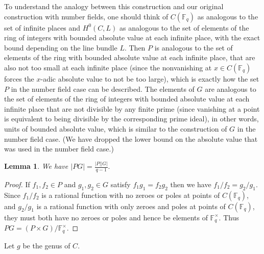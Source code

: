 \documentclass{amsart}
\numberwithin{equation}{section}
\newtheorem{lemma}[theorem]{Lemma}
\begin{document}
To understand the analogy between this construction and our original construction with number fields, one should think of $C(\mathbb F_q)$ as analogous to the set of infinite places and $H^0(C,L)$ as analogous to the set of elements of the ring of integers with bounded absolute value at each infinite place, with the exact bound depending on the line bundle $L$. Then $P$ is analogous to the set of elements of the ring with bounded absolute value at each infinite place, that are also not too small at each infinite place (since the nonvanishing at $x\in C(\mathbb F_q)$ forces the $x$-adic absolute value to not be too large), which is exactly how the set $P$ in the number field case can be described. The elements of $G$ are analogous to the set of elements of the ring of integers with bounded absolute value at each infinite place that are not divisible by any finite prime (since vanishing at a point is equivalent to being divisible by the corresponding prime ideal), in other words, units of bounded absolute value, which is similar to the construction of $G$ in the number field case. (We have dropped the lower bound on the absolute value that was used in the number field case.)

\begin{lemma}\label{ff-pg} We have $ |PG| = \frac{|P| |G|}{q-1}.$\end{lemma}

\begin{proof}  If $f_1,f_2 \in P$ and $g_1,g_2\in G$ satisfy $f_1g_1=f_2g_2$ then we have $f_1/f_2=g_2/g_1$. Since $f_1/f_2$ is a rational function with no zeroes or poles at points of $C(\mathbb F_q)$, and $g_2/g_1$ is a rational function with only zeroes and poles at points of $C(\mathbb F_q)$, they must both have no zeroes or poles and hence be elements of $\mathbb F_q^\times$. Thus $PG = (P \times G)/\mathbb F_q^\times$.\end{proof}

Let $g$ be the genus of $C$.
\end{document}
